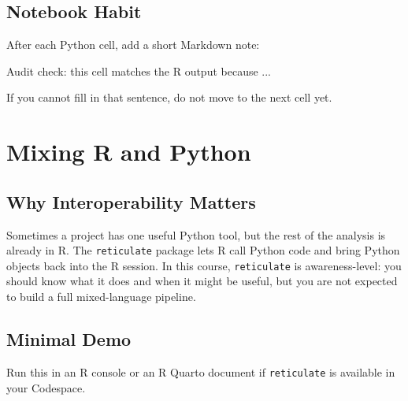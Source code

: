 \documentclass[
  letterpaper,
  DIV=11,
  numbers=noendperiod,
  oneside]{scrreprt}
\newenvironment{Shaded}{\begin{snugshade}}{\end{snugshade}}
\newcommand{\FunctionTok}[1]{\textcolor[rgb]{0.28,0.35,0.67}{#1}}
\newcommand{\NormalTok}[1]{\textcolor[rgb]{0.00,0.23,0.31}{#1}}
\newcommand{\SpecialCharTok}[1]{\textcolor[rgb]{0.37,0.37,0.37}{#1}}
\newcommand{\StringTok}[1]{\textcolor[rgb]{0.13,0.47,0.30}{#1}}
\begin{document}
\section{Notebook Habit}\label{notebook-habit}

After each Python cell, add a short Markdown note:

\begin{Shaded}
\begin{Highlighting}[numbers=left,,]
\NormalTok{Audit check: this cell matches the R output because ...}
\end{Highlighting}
\end{Shaded}

If you cannot fill in that sentence, do not move to the next cell yet.

\chapter{Mixing R and Python}\label{mixing-r-and-python}

\section{Why Interoperability
Matters}\label{why-interoperability-matters}

Sometimes a project has one useful Python tool, but the rest of the
analysis is already in R. The \texttt{reticulate} package lets R call
Python code and bring Python objects back into the R session. In this
course, \texttt{reticulate} is awareness-level: you should know what it
does and when it might be useful, but you are not expected to build a
full mixed-language pipeline.

\section{Minimal Demo}\label{minimal-demo}

Run this in an R console or an R Quarto document if \texttt{reticulate}
is available in your Codespace.

\begin{Shaded}
\end{Shaded}
\end{document}
